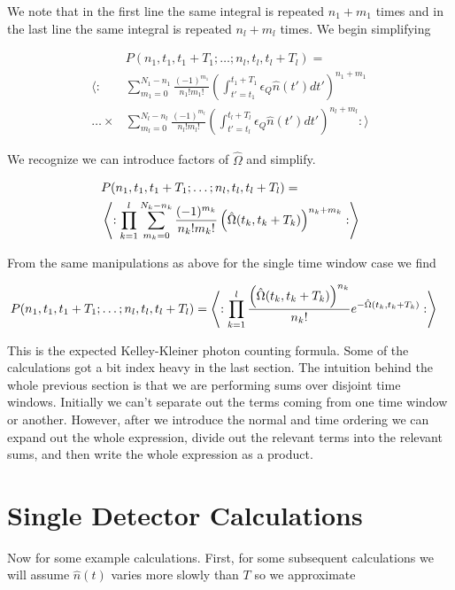 \documentclass[12pt]{article}
\begin{document}
We note that in the first line the same integral is repeated $n_1+m_1$ times and in the last line the same integral is repeated $n_l+m_l$ times. We begin simplifying

\begin{align}
&P(n_1,t_1,t_1+T_1;\ldots ;n_l,t_l,t_l+T_l) =\\
\Bigg \langle: &\sum_{m_1=0}^{N_1-n_1} \frac{(-1)^{m_1}}{n_1 ! m_1!} \left(\int_{t'=t_1}^{t_1+T_1} \epsilon_Q \hat{n}(t') dt' \right)^{n_1+m_1}\\
\ldots \times &\sum_{m_l=0}^{N_l-n_l} \frac{(-1)^{m_l}}{n_l ! m_l!} \left(\int_{t'=t_l}^{t_l+T_l} \epsilon_Q \hat{n}(t') dt' \right)^{n_l+m_l} :\Bigg \rangle
\end{align}

We recognize we can introduce factors of $\hat{\Omega}$ and simplify.

\begin{align}
&P(n_1,t_1,t_1+T_1;\ldots ;n_l,t_l,t_l+T_l) =\\
&\Braket{:\prod_{k=1}^{l} \sum_{m_k=0}^{N_k-n_k} \frac{(-1)^{m_k}}{n_k! m_k!} \left(\hat{\Omega}(t_k,t_k+T_k)\right)^{n_k+m_k} :}
\end{align}

From the same manipulations as above for the single time window case we find

\begin{align}
&P(n_1,t_1,t_1+T_1;\ldots ;n_l,t_l,t_l+T_l) = \Braket{:\prod_{k=1}^l \frac{\left(\hat{\Omega}(t_k,t_k+T_k)\right)^{n_k}}{n_k!} e^{-\hat{\Omega}(t_k,t_k+T_k)} :}
\end{align}

This is the expected Kelley-Kleiner photon counting formula. Some of the calculations got a bit index heavy in the last section. The intuition behind the whole previous section is that we are performing sums over disjoint time windows. Initially we can't separate out the terms coming from one time window or another. However, after we introduce the normal and time ordering we can expand out the whole expression, divide out the relevant terms into the relevant sums, and then write the whole expression as a product.

\section{Single Detector Calculations}
Now for some example calculations. First, for some subsequent calculations we will assume $\hat{n}(t)$ varies more slowly than $T$ so we approximate
\end{document}
